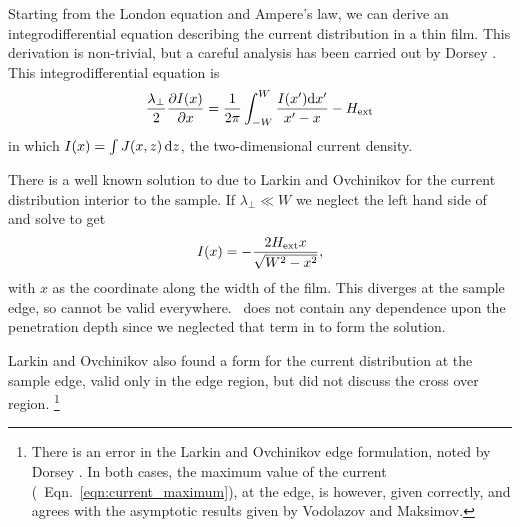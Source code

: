 %
Starting from the London equation and Ampere's law, we can derive
an integrodifferential equation describing the current distribution
in a thin film. This derivation is non-trivial, but a careful 
analysis has been carried out by Dorsey \cite{dorsey_prb_51_15329_1995}.
This integrodifferential equation is
%
\begin{equation}
{\lambda_\perp \over 2} {\partial I(x) \over \partial x} = 
{1 \over 2 \pi} \int_{-W}^{W} {I(x') \mathrm{d} x' \over x'-x} - H_{\mathrm{ext}}
\label{eqn:intdifeqn}
\end{equation}
%
in which $I(x) = \int J(x,z)\,\mathrm{d} z$, the two-dimensional 
current density.

There is a well known solution to  due to 
Larkin and Ovchinikov \cite{larkin_jetp_34_651_1972} for the 
current distribution interior to the sample. 
If $\lambda_\perp \ll W$ we neglect the left hand side of 
 and solve to get
%
\begin{equation}
I(x) = - { 2 H_\mathrm{ext} x \over \sqrt{W^2 - x^2}}, 
\label{eqn:LO_result}
\end{equation}
%
with $x$ as the 
coordinate along the width of the film.
This diverges at the sample edge, so cannot be valid everywhere. 
\ does not contain any dependence 
upon the penetration depth since we neglected that term in 
 to form the solution. 

Larkin and Ovchinikov also found a form for the current
distribution at the sample edge, valid only in the edge region, 
but did not discuss the cross over region.%
\footnote{There is an error in the Larkin and Ovchinikov edge formulation,
noted by Dorsey \cite{dorsey_prb_51_15329_1995}. In both cases,
the maximum value of the current
(\cf\ Eqn.~\ref{eqn:current_maximum}), at the edge, is however,
given correctly, and agrees with the asymptotic results given
by Vodolazov and Maksimov\cite{vodolazov_physc_349_125_2001}.
}




